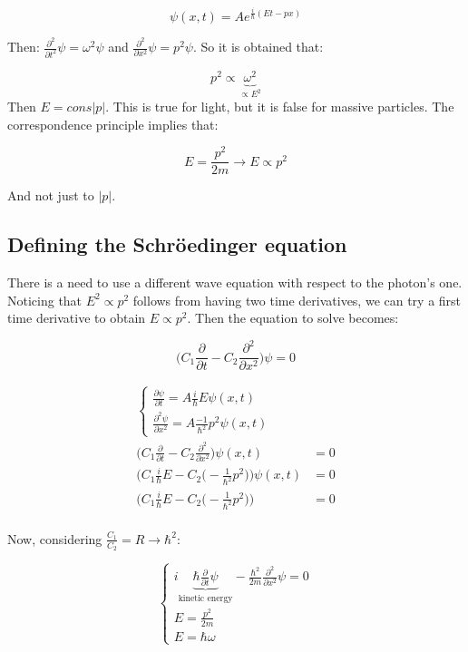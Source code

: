   $$\psi(x,t) = Ae^{\frac{i}{\hbar}(Et -px)}$$

\noindent
  Then: $\frac{\partial^2{}}{\partial{t^2}}\psi = \omega^2\psi$ and $\frac{\partial^2}{\partial x^2}\psi = p^2\psi$.
  So it is obtained that:

  $${p^2}\propto\underbrace{\omega^2}_{\propto E^2}$$
\noindent
  Then $E = cons|p|$.
  This is true for light, but it is false for massive particles. The correspondence principle implies that:

  $$E = \frac{p^2}{2m}\rightarrow E\propto p^2$$

  And not just to $|p|$.

  \subsection{Defining the Schr\"oedinger equation}
  There is a need to use a different wave equation with respect to the photon's one.
  Noticing that $E^2\propto p^2$ follows from having two time derivatives, we can try a first time derivative to obtain $E\propto p^2$.
  Then the equation to solve becomes:

  $$\biggl(C_1\frac{\partial}{\partial t}-C_2\frac{\partial^2}{\partial x^2}\biggr)\psi = 0$$

  \begin{align*}
    \begin{cases}\frac{\partial\psi}{\partial t} = A\frac{i}{\hbar}E\psi(x,t)\\\frac{\partial^2\psi}{\partial x^2} = A\frac{-1}{\hbar^2}p^2\psi(x,t)\end{cases}\\
    \biggl(C_1\frac{\partial}{\partial t} - C_2\frac{\partial^2}{\partial x^2}\biggr)\psi(x,t) &=0\\
    \biggl(C_1\frac{i}{\hbar}E-C_2\bigl(-\frac{1}{\hbar^2}p^2\bigr)\biggr)\psi(x,t) &= 0\\
    \biggl(C_1\frac{i}{\hbar}E-C_2\bigl(-\frac{1}{\hbar^2}p^2\bigr)\biggr) &= 0\\
  \end{align*}

  Now, considering $\frac{C_1}{C_2}=R\rightarrow \hbar^2$:

  $$\begin{cases} i\underbrace{\hbar\frac{\partial}{\partial t}\psi}_{\text{kinetic energy}}-\frac{\hbar^2}{2m}\frac{\partial^2}{\partial x^2}\psi = 0\\E =\frac{p^2}{2m}\\E = \hbar\omega\end{cases}$$

